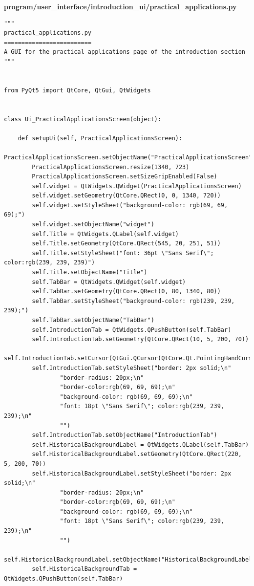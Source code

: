 \documentclass{article}
\begin{document}
\textbf{program/user\_interface/introduction\_ui/practical\_applications.py}
\begin{lstlisting}
"""
practical_applications.py
=========================
A GUI for the practical applications page of the introduction section
"""


from PyQt5 import QtCore, QtGui, QtWidgets


class Ui_PracticalApplicationsScreen(object):

    def setupUi(self, PracticalApplicationsScreen):
        PracticalApplicationsScreen.setObjectName("PracticalApplicationsScreen")
        PracticalApplicationsScreen.resize(1340, 723)
        PracticalApplicationsScreen.setSizeGripEnabled(False)
        self.widget = QtWidgets.QWidget(PracticalApplicationsScreen)
        self.widget.setGeometry(QtCore.QRect(0, 0, 1340, 720))
        self.widget.setStyleSheet("background-color: rgb(69, 69, 69);")
        self.widget.setObjectName("widget")
        self.Title = QtWidgets.QLabel(self.widget)
        self.Title.setGeometry(QtCore.QRect(545, 20, 251, 51))
        self.Title.setStyleSheet("font: 36pt \"Sans Serif\"; color:rgb(239, 239, 239)")
        self.Title.setObjectName("Title")
        self.TabBar = QtWidgets.QWidget(self.widget)
        self.TabBar.setGeometry(QtCore.QRect(0, 80, 1340, 80))
        self.TabBar.setStyleSheet("background-color: rgb(239, 239, 239);")
        self.TabBar.setObjectName("TabBar")
        self.IntroductionTab = QtWidgets.QPushButton(self.TabBar)
        self.IntroductionTab.setGeometry(QtCore.QRect(10, 5, 200, 70))
        self.IntroductionTab.setCursor(QtGui.QCursor(QtCore.Qt.PointingHandCursor))
        self.IntroductionTab.setStyleSheet("border: 2px solid;\n"
                "border-radius: 20px;\n"
                "border-color:rgb(69, 69, 69);\n"
                "background-color: rgb(69, 69, 69);\n"
                "font: 18pt \"Sans Serif\"; color:rgb(239, 239, 239);\n"
                "")
        self.IntroductionTab.setObjectName("IntroductionTab")
        self.HistoricalBackgroundLabel = QtWidgets.QLabel(self.TabBar)
        self.HistoricalBackgroundLabel.setGeometry(QtCore.QRect(220, 5, 200, 70))
        self.HistoricalBackgroundLabel.setStyleSheet("border: 2px solid;\n"
                "border-radius: 20px;\n"
                "border-color:rgb(69, 69, 69);\n"
                "background-color: rgb(69, 69, 69);\n"
                "font: 18pt \"Sans Serif\"; color:rgb(239, 239, 239);\n"
                "")
        self.HistoricalBackgroundLabel.setObjectName("HistoricalBackgroundLabel")
        self.HistoricalBackgroundTab = QtWidgets.QPushButton(self.TabBar)

\end{lstlisting}
\end{document}
